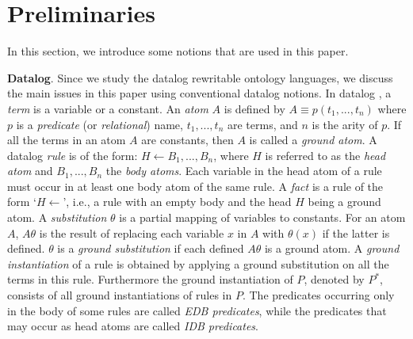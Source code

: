 \documentclass{article}
\begin{document}
\section{Preliminaries}

In this section, we introduce some notions that are used in this paper.

\textbf{Datalog}. Since we study the datalog rewritable ontology
languages, we discuss the main issues in this paper using
conventional datalog notions.
In datalog \cite{database}, a \emph{term} is a variable or a constant. An \emph{atom} $A$ is defined by $A\equiv p(t_1,...,t_n)$ where $p$ is a \emph{predicate} (or \emph{relational}) name, $t_1,...,t_n$ are terms, and $n$ is the arity of $p$. If all the terms in an atom $A$ are constants, then $A$ is called a \emph{ground atom}.
A datalog \emph{rule} is of the form: $ H\leftarrow B_1,...,B_n$, where $H$ is referred to as the \emph{head atom} and $B_1,...,B_n$ the \emph{body atoms}. Each variable in the head atom of a rule must occur in at least one body atom of the same rule. A \emph{fact} is a rule of the form `$H\leftarrow$', i.e., a rule with an empty body and the head $H$ being a ground atom.
A \emph{substitution} $\theta$ is a partial mapping of variables to constants. For an atom $A$, $A\theta$ is the result of replacing each variable $x$ in $A$ with $\theta(x)$ if the latter is defined. $\theta$ is a \emph{ground substitution} if each defined $A\theta$ is a ground atom. A \emph{ground instantiation} of a rule is obtained by applying a ground substitution on all the terms in this rule. Furthermore the ground instantiation of $P$, denoted by $P^*$, consists of all ground instantiations of rules in $P$. The predicates occurring only in the body of some rules are called \emph{EDB predicates}, while the predicates that may occur as head atoms are called \emph{IDB predicates}.
\end{document}
